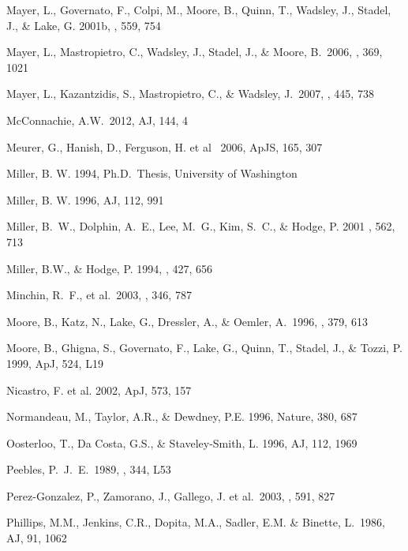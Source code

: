 \documentclass[12pt,preprint]{aastex}
\begin{document}
\begin{thebibliography}{}
Mayer, L., Governato, F., Colpi, M., Moore, B., Quinn, T., Wadsley, J., 
Stadel, J., \& Lake, G. 2001b, \apj, 559, 754 

Mayer, L., Mastropietro, C., Wadsley, J., Stadel, J., \& 
   Moore, B.\ 2006, \mnras, 369, 1021

Mayer, L., Kazantzidis, S., Mastropietro, C., \& Wadsley, J.\ 2007, \nat, 445, 738 

McConnachie, A.W.\ 2012, AJ, 144, 4 

Meurer, G., Hanish, D., Ferguson, H. et al \ 2006, ApJS, 165, 307 

Miller, B. W. 1994, Ph.D.\ Thesis, University of Washington

Miller, B. W. 1996, AJ, 112, 991 

Miller, B.~W., Dolphin, A.~E., Lee, M.~G., Kim, S.~C., \& Hodge, P. 2001
\apj , 562, 713

Miller, B.W., \& Hodge, P. 1994, \apj , 427, 656

Minchin, R.~F., et al.\ 2003, \mnras, 346, 787 

Moore, B., Katz, N., Lake, G., Dressler, A., \& Oemler, A.\ 1996, \nat, 379, 613 

Moore, B., Ghigna, S., Governato, F., Lake, G., Quinn, T., Stadel, J., \&
Tozzi, P. 1999, ApJ, 524, L19

Nicastro, F. et al. 2002, ApJ, 573, 157

Normandeau, M., Taylor, A.R., \& Dewdney, P.E. 1996, Nature, 380, 687

Oosterloo, T., Da Costa, G.S., \& Staveley-Smith, L. 1996, AJ, 112, 1969

Peebles, P.~J.~E.\ 1989, \apjl, 344, L53 

Perez-Gonzalez, P., Zamorano, J., Gallego, J. et al.\ 2003, \apj, 591, 827 

Phillips, M.M., Jenkins, C.R., Dopita, M.A., Sadler, E.M. \& Binette, L.\ 1986, AJ, 91, 1062


\end{thebibliography}
\end{document}
